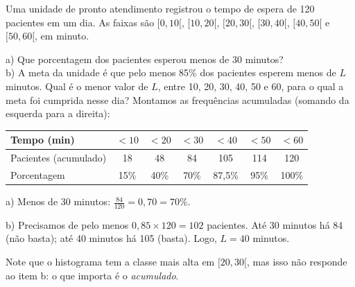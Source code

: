 \begin{exemplo}
Uma unidade de pronto atendimento registrou o tempo de espera de 120 pacientes
em um dia. As faixas são $[0,10[$, $[10,20[$, $[20,30[$, $[30,40[$, $[40,50[$
e $[50,60[$, em minuto.

\begin{center}
\end{center}

a) Que porcentagem dos pacientes esperou menos de 30 minutos?\\
b) A meta da unidade é que pelo menos 85\% dos pacientes esperem menos de $L$
minutos. Qual é o menor valor de $L$, entre 10, 20, 30, 40, 50 e 60, para o qual
a meta foi cumprida nesse dia?
\solucao
Montamos as frequências acumuladas (somando da esquerda para a direita):

\begin{center}\small
\begin{tabular}{lcccccc}
\toprule
Tempo (min) & $<10$ & $<20$ & $<30$ & $<40$ & $<50$ & $<60$\\
\midrule
Pacientes (acumulado) & 18 & 48 & 84 & 105 & 114 & 120\\
Porcentagem & 15\% & 40\% & 70\% & 87{,}5\% & 95\% & 100\%\\
\bottomrule
\end{tabular}
\end{center}

a) Menos de 30 minutos: $\frac{84}{120}=0{,}70=70\%$.

b) Precisamos de pelo menos $0{,}85\times120=102$ pacientes. Até 30 minutos há
84 (não basta); até 40 minutos há 105 (basta). Logo, $L=40$ minutos.

Note que o histograma tem a classe mais alta em $[20,30[$, mas isso não responde
ao item b: o que importa é o \emph{acumulado}.
\end{exemplo}


